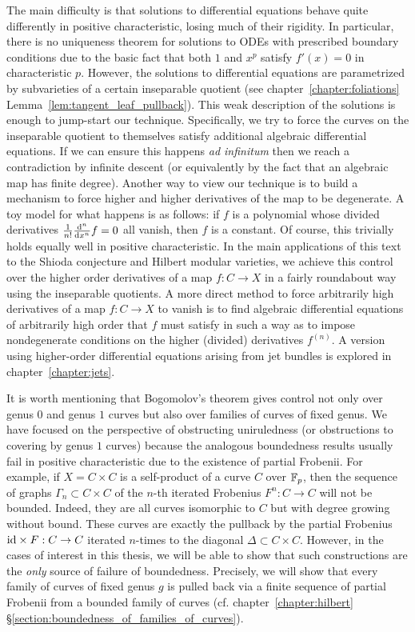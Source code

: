 \documentclass[main.tex]{subfiles}
\begin{document}
The main difficulty is that solutions to differential equations behave quite differently in positive characteristic, losing much of their rigidity. In particular, there is no uniqueness theorem for solutions to ODEs with prescribed boundary conditions due to the basic fact that both $1$ and $x^p$ satisfy $f'(x) = 0$ in characteristic $p$. However, the solutions to differential equations are parametrized by subvarieties of a certain inseparable quotient (see chapter~\ref{chapter:foliations} Lemma~\ref{lem:tangent_leaf_pullback}). This weak description of the solutions is enough to jump-start our technique. Specifically, we try to force the curves on the inseparable quotient to themselves satisfy additional algebraic differential equations. If we can ensure this happens \textit{ad infinitum} then we reach a contradiction by infinite descent (or equivalently by the fact that an algebraic map has finite degree). Another way to view our technique is to build a mechanism to force higher and higher derivatives of the map to be degenerate. A toy model for what happens is as follows: if $f$ is a polynomial whose divided derivatives $\frac{1}{n!} \frac{\mathrm{d}^n}{\mathrm{d} x^n} f = 0$ all vanish, then $f$ is a constant. Of course, this trivially holds equally well in positive characteristic. In the main applications of this text to the Shioda conjecture and Hilbert modular varieties, we achieve this control over the higher order derivatives of a map $f : C \to X$ in a fairly roundabout way using the inseparable quotients. A more direct method to force arbitrarily high derivatives of a map $f : C \to X$ to vanish is to find algebraic differential equations of arbitrarily high order that $f$ must satisfy in such a way as to impose nondegenerate conditions on the higher (divided) derivatives $f^{(n)}$. A version using higher-order differential equations arising from jet bundles is explored in chapter~\ref{chapter:jets}.
\par 
It is worth mentioning that Bogomolov's theorem gives control not only over genus $0$ and genus $1$ curves but also over families of curves of fixed genus. We have focused on the perspective of obstructing uniruledness (or obstructions to covering by genus $1$ curves) because the analogous boundedness results usually fail in positive characteristic due to the existence of partial Frobenii. For example, if $X = C \times C$ is a self-product of a curve $C$ over $\mathbb{F}_p$, then the sequence of graphs $\Gamma_n \subset C \times C$ of the $n$-th iterated Frobenius $F^n : C \to C$ will not be bounded. Indeed, they are all curves isomorphic to $C$ but with degree growing without bound. These curves are exactly the pullback by the partial Frobenius $\mathrm{id} \times F : C \to C$ iterated $n$-times to the diagonal $\Delta \subset C \times C$. However, in the cases of interest in this thesis, we will be able to show that such constructions are the \textit{only} source of failure of boundedness. Precisely, we will show that every family of curves of fixed genus $g$ is pulled back via a finite sequence of partial Frobenii from a bounded family of curves (cf. chapter~\ref{chapter:hilbert} \S\ref{section:boundedness_of_families_of_curves}).
\end{document}
